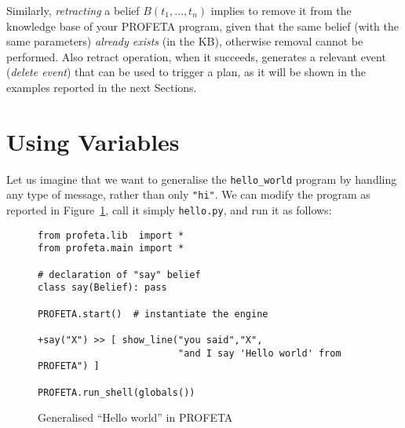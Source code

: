Similarly, \emph{retracting} a belief  $B(t_1, \dots, t_n)$ implies to
remove it from the
knowledge base of your PROFETA program, given that the same belief
(with the same parameters) \emph{already exists} (in the KB), otherwise
removal cannot be performed.
Also retract operation, when it succeeds, generates a relevant event
(\emph{delete event}) that can be used to trigger a plan, as it will be
shown in the examples reported in the next Sections.


\section{Using Variables}
Let us imagine that we want to generalise the \texttt{hello\_world} program
by handling any type of message, rather than only \texttt{"hi"}.
We can modify the program as reported in Figure~\ref{fig:hello_gen},
call it simply \texttt{hello.py}, and run it as follows:

\begin{figure}[b!]
\python%
\begin{lstlisting}
from profeta.lib  import *
from profeta.main import *

# declaration of "say" belief
class say(Belief): pass

PROFETA.start()  # instantiate the engine

+say("X") >> [ show_line("you said","X",
                         "and I say 'Hello world' from PROFETA") ]

PROFETA.run_shell(globals())
\end{lstlisting}
\caption{Generalised ``Hello world'' in PROFETA}\label{fig:hello_gen}
\end{figure}

